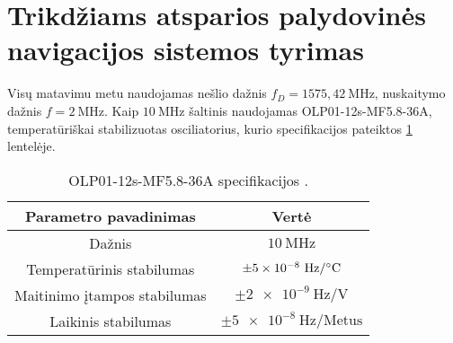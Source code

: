 \documentclass[../gnss_interference_resistant_thesis.tex]{subfiles}
\begin{document}
\section{Trikdžiams atsparios palydovinės navigacijos sistemos tyrimas}

Visų matavimu metu naudojamas nešlio dažnis
$f_D = 1575,42\ \mathrm{MHz}$, nuskaitymo dažnis $f = 2\ \mathrm{MHz}$.
Kaip $10\ \mathrm{MHz}$ šaltinis
naudojamas OLP01-12s-MF5.8-36A, temperatūriškai stabilizuotas osciliatorius,
kurio specifikacijos pateiktos \ref{tab:clock_source_spec} lentelėje.


\begin{table}[h]
    \protect\caption{\label{tab:clock_source_spec}OLP01-12s-MF5.8-36A specifikacijos \cite{macrobizes_olp}.}
    \centering{}%
    \begin{tabular}{| c | c |}
    \hline
    Parametro pavadinimas & Vertė \\
    \hline
    Dažnis                         & $10\ \mathrm{MHz}$ \\
    Temperatūrinis stabilumas      & $\pm \num{5e-8}\ \mathrm{Hz/\degree C}$ \\
    Maitinimo įtampos stabilumas   & $\pm \num{2e-9}\ \mathrm{Hz/V}$ \\
    Laikinis stabilumas             & $\pm \num{5e-8}\ \mathrm{Hz/Metus}$ \\
    \hline
    \end{tabular}
\end{table}







\end{document}
